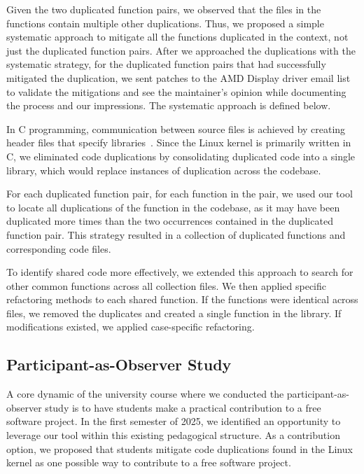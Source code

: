 \documentclass[10pt,conference]{IEEEtran}
\begin{document}
Given the two duplicated function pairs, we observed that the files in the functions 
contain multiple other duplications. Thus, we proposed a simple systematic approach 
to mitigate all the functions duplicated in the context, not just the duplicated 
function pairs. 
After we approached the duplications with the systematic strategy, for the duplicated 
function pairs that had successfully mitigated the duplication, we sent patches to the 
AMD Display driver email list to validate the mitigations and see the maintainer's opinion 
while documenting the process and our impressions.
The systematic approach is defined below. 

In C programming, communication between source files is achieved by creating header files that specify 
libraries~\cite{Cbook}. Since the Linux kernel is primarily written in C, we eliminated code duplications 
by consolidating duplicated code into a single library, which would replace instances of 
duplication across the codebase.

For each duplicated function pair, for each function in the pair, we used our tool to locate all duplications of the function in the codebase, as it may have been duplicated more times than the two occurrences contained in the duplicated function pair. 
This strategy resulted in a collection of duplicated functions and corresponding code files.

To identify shared code more effectively, we extended this approach to search for other common 
functions across all collection files. We then applied specific refactoring methods to each shared 
function. If the functions were identical across files, we removed the duplicates and created a single 
function in the library. If modifications existed, we applied case-specific refactoring.

\subsection{Participant-as-Observer Study}

A core dynamic of the university course where we conducted the participant-as-observer study is to have students make a practical contribution to a free software project. In the first semester of 2025, we identified an opportunity to leverage our tool within this existing pedagogical structure. As a contribution option, we proposed that students mitigate code duplications found in the Linux kernel as one possible way to contribute to a free software project.
\end{document}
